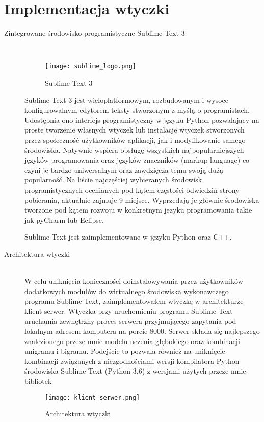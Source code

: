 \newpage %
 

\section{Implementacja wtyczki}
\begin{description}
\item[Zintegrowane środowisko programistyczne Sublime Text 3]
\hfill\\
\begin{figure}[!h]
	\caption{Sublime Text 3}
    \label{fig:sublime_logo}
    \centering \texttt{[image: sublime\_logo.png]}
\end{figure}
Sublime Text 3 \cite{sublime} jest wieloplatformowym, rozbudowanym i wysoce konfigurowalnym edytorem teksty stworzonym z myślą 
o programistach. Udostępnia ono interfejs programistyczny w języku Python pozwalający na proste tworzenie własnych 
wtyczek lub instalacje wtyczek stworzonych przez społeczność użytkowników aplikacji, jak i modyfikowanie samego 
środowiska. Natywnie wspiera obsługę wszystkich najpopularniejszych języków programowania oraz języków znaczników 
(markup language) co czyni je bardzo uniwersalnym oraz zawdzięcza temu swoją dużą popularność. Na liście najczęściej 
wybieranych środowisk programistycznych \cite{topide} ocenianych pod kątem częstości odwiedziń strony pobierania, 
aktualnie zajmuje 9 miejsce. Wyprzedają je głównie środowiska tworzone pod kątem rozwoju w konkretnym języku programowania 
takie jak pyCharm lub Eclipse.  

Sublime Text jest zaimplementowane w języku Python oraz C++. \\

\item[Architektura wtyczki]
\hfill\\ 
W celu uniknięcia konieczności doinstalowywania przez użytkowników dodatkowych modułów do wirtualnego środowiska wykonawczego programu Sublime Text, 
zaimplementowałem wtyczkę w architekturze klient-serwer. Wtyczka przy uruchomieniu programu Sublime Text uruchamia zewnętrzny proces serwera 
przyjmującego zapytania pod lokalnym adresem komputera na porcie 8000. Serwer składa się najlepszego znalezionego przeze mnie modelu 
uczenia głębokiego oraz kombinacji unigramu i bigramu. Podejście to pozwala również na uniknięcie kombinacji związanych z niezgodnościami 
wersji kompilatora Python środowiska Sublime Text (Python 3.6) z wersjami użytych przeze mnie bibliotek 

\begin{figure}[!h]
	\caption{Architektura wtyczki}
    \label{fig:klient-serwer}
    \centering \texttt{[image: klient\_serwer.png]}
\end{figure}
\end{description}
